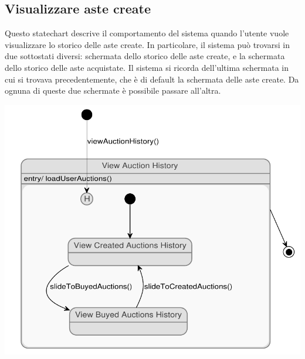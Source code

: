 \subsection{Visualizzare aste create}
Questo statechart descrive il comportamento del sistema quando l'utente vuole visualizzare lo storico delle aste create.
In particolare, il sistema può trovarsi in due sottostati diversi: schermata dello storico delle aste create, e la schermata dello storico delle aste acquistate.
Il sistema si ricorda dell'ultima schermata in cui si trovava precedentemente, che è di default la schermata delle aste create.
Da ognuna di queste due schermate è possibile passare all'altra.
\begin{center}
	\includegraphics[width=.75\textwidth]{assets/state_charts/visualizzare_aste_create.pdf}
\end{center}
\newpage